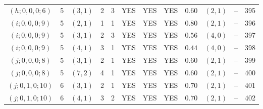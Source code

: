 \begin{longtable}{|c|c|c|c|c|c|c|c|c|c|c|c|}
$(h;0,0,0;6)$ & 5 & $(3,1)$ & 2 & 3 & YES & YES & YES & $0.60$ & $(2,1)$ & -- & 395\\
$(i;0,0,0;9)$ & 5 & $(2,1)$ & 1 & 1 & YES & YES & YES & $0.80$ & $(2,1)$ & -- & 396\\
$(i;0,0,0;9)$ & 5 & $(3,1)$ & 2 & 3 & YES & YES & YES & $0.56$ & $(4,0)$ & -- & 397\\
$(i;0,0,0;9)$ & 5 & $(4,1)$ & 3 & 1 & YES & YES & YES & $0.44$ & $(4,0)$ & -- & 398\\
$(j;0,0,0;8)$ & 5 & $(3,1)$ & 2 & 1 & YES & YES & YES & $0.60$ & $(2,1)$ & -- & 399\\
$(j;0,0,0;8)$ & 5 & $(7,2)$ & 4 & 1 & YES & YES & YES & $0.60$ & $(2,1)$ & -- & 400\\
$(j;0,1,0;10)$ & 6 & $(3,1)$ & 2 & 1 & YES & YES & YES & $0.70$ & $(2,1)$ & -- & 401\\
$(j;0,1,0;10)$ & 6 & $(4,1)$ & 3 & 2 & YES & YES & YES & $0.70$ & $(2,1)$ & -- & 402
\end{longtable}

